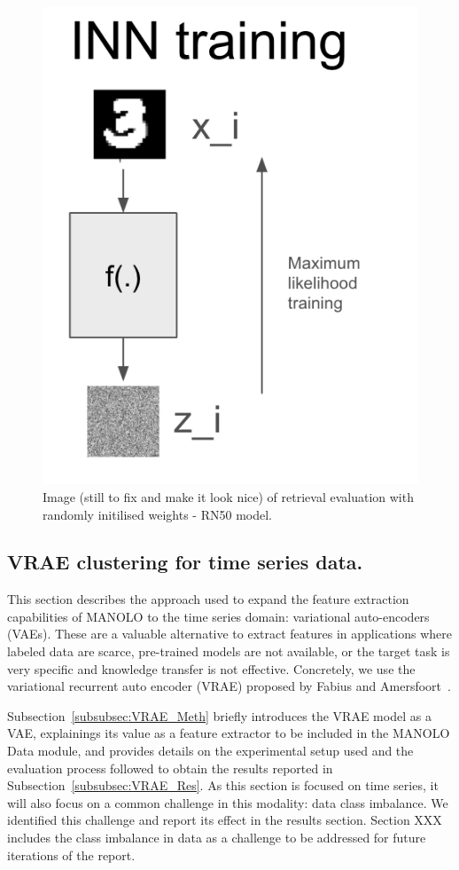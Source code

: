 \begin{figure}
    \vskip -0.2in 
    \centering

    \includegraphics[width=0.30\columnwidth]{fig_datasynth/inn_train.png}  
            
    \vspace{-2pt}
    \caption{\label{fig:exp_feat_extr_retrieval_randInit} Image (still to fix and make it look nice) of retrieval evaluation with randomly initilised weights - RN50 model.}
    \vskip -0.0in 
\end{figure}

\subsection{VRAE clustering for time series data.}
\label{subsec:2.3_featext_tech2}

This section describes the approach used to expand the feature extraction capabilities of MANOLO to the time series domain: variational auto-encoders (VAEs). These are a valuable alternative to extract features in applications where labeled data are scarce, pre-trained models are not available, or the target task is very specific and knowledge transfer is not effective. Concretely, we use the variational recurrent auto encoder (VRAE) proposed by Fabius and Amersfoort~\cite{2015_ICLRw_VRAE}. 

Subsection~\ref{subsubsec:VRAE_Meth} briefly introduces the VRAE model as a VAE, explainings its value as a feature extractor to be included in the MANOLO Data module, and provides details on the experimental setup used and the evaluation process followed to obtain the results reported in Subsection~\ref{subsubsec:VRAE_Res}. As this section is focused on time series, it will also focus on a common challenge in this modality: data class imbalance. We identified this challenge and report its effect in the results section. Section XXX includes the class imbalance in data as a challenge to be addressed for future iterations of the report. 
    
